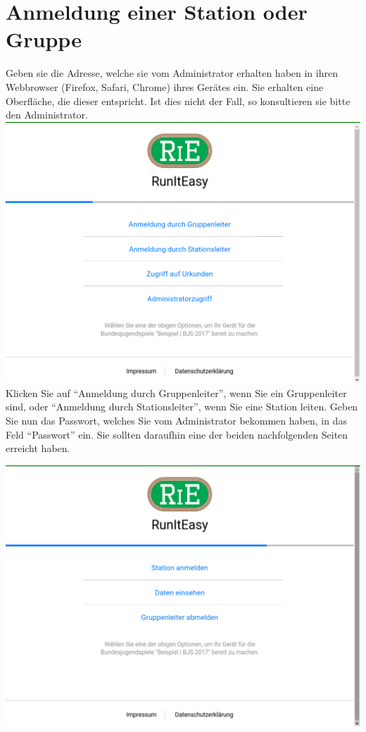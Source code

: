\documentclass[11pt,a4paper,titlepage,german]{article}
\begin{document}
		\section[Anmeldung]{Anmeldung einer Station oder Gruppe}
			\label{login}
			Geben sie die Adresse, welche sie vom Administrator erhalten haben in ihren Webbrowser (Firefox, Safari, Chrome) ihres Gerätes ein. Sie erhalten eine Oberfläche, die dieser entspricht. Ist dies nicht der Fall, so konsultieren sie bitte den Administrator.\\
			\includegraphics[width=\textwidth]{Login.png}
			Klicken Sie auf “Anmeldung durch Gruppenleiter”, wenn Sie ein Gruppenleiter sind, oder “Anmeldung durch Stationsleiter”, wenn Sie eine Station leiten.  Geben Sie nun das Passwort, welches Sie vom Administrator bekommen haben, in das Feld “Passwort” ein. Sie sollten daraufhin eine der beiden nachfolgenden Seiten erreicht haben.\\
			\includegraphics[width=\textwidth]{LoggedIn-Group}
\end{document}
